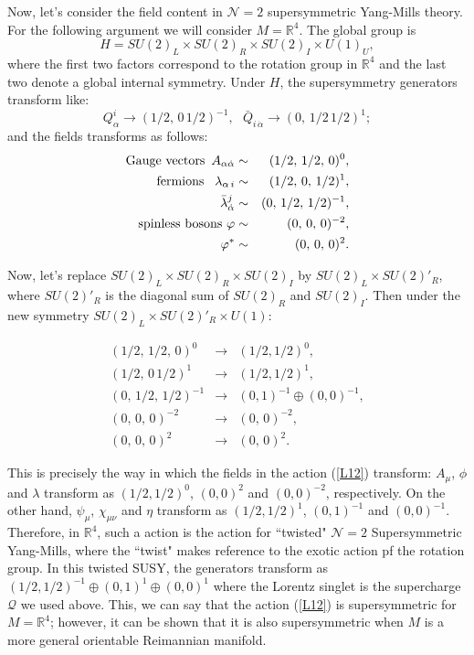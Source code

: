 \documentclass[12pt, onecolumn]{article}
\begin{document}
Now, let's consider the field content in $\mathcal{N}=2$ supersymmetric Yang-Mills theory. For the following argument we will consider $M= \mathbb{R}^4$. The global group is $$H=SU(2)_L\times SU(2)_R\times SU(2)_I\times U(1)_U,$$ where the first two factors correspond to the rotation group in $\mathbb{R}^4$ and the last two denote a global internal symmetry. Under $H$, the supersymmetry generators transform like:
\begin{equation}
Q^i_\alpha \longrightarrow  (1/2,\,0\,1/2)^{-1},\,\,\,\,\bar{Q}_{i\,\dot{\alpha}} \longrightarrow  (0,\,1/2\,1/2)^{1};
\end{equation} 
and the fields transforms as follows:
\begin{eqnarray}
{\rm Gauge\,\, vectors}\,\,\,A_{\alpha \dot{\alpha}} &\sim & (1/2,\,1/2,\,0)^0, \nonumber \\
{\rm fermions\,\,}\,\,\,\lambda_{\alpha\, i} &\sim & (1/2,\,0,\,1/2)^{1}, \nonumber \\
{\rm \,\,\,\,\,\,\,\,\,}\bar{\lambda}_{\dot{\alpha}}^j &\sim & (0,\,1/2,\,1/2)^{-1}, \\
{\rm spinless\,\,bosons\,\,}\varphi &\sim & (0,\,0,\,0)^{-2}, \nonumber \\
{\rm \,\,\,\,\,\,\,\,\,\,\,\,\,\,\,}\varphi^* &\sim & (0,\,0,\,0)^{2}. \nonumber 
\end{eqnarray}

Now, let's replace $SU(2)_L\times SU(2)_R\times SU(2)_I$ by $SU(2)_L\times SU(2)'_R$, where $SU(2)'_R$ is the diagonal sum of $SU(2)_R$ and $SU(2)_I$. Then under the new symmetry $SU(2)_L\times SU(2)'_R\times U(1)$:

\begin{eqnarray} 
(1/2,\,1/2,\,0)^0 &\longrightarrow & (1/2,1/2)^0, \nonumber \\
(1/2,\,0\,1/2)^{1} &\longrightarrow & (1/2,1/2)^1, \nonumber \\
(0,\,1/2,\,1/2)^{-1} &\longrightarrow & (0,1)^{-1}\oplus(0,0)^{-1}, \\
(0,\,0,\,0)^{-2}&\longrightarrow &(0,\,0)^{-2},\nonumber \\
(0,\,0,\,0)^{2}&\longrightarrow &(0,\,0)^{2}.\nonumber 
\end{eqnarray}

This is precisely the way in which the fields in the action (\ref{L12}) transform: $A_\mu$, $\phi$ and $\lambda$ transform as $(1/2,1/2)^0$, $(0,0)^{2}$ and $(0,0)^{-2}$, respectively. On the other hand, $\psi_\mu$, $\chi_{\mu\nu}$ and $\eta$ transform as $(1/2,1/2)^1$, $(0,1)^{-1}$ and $(0,0)^{-1}$. Therefore, in $\mathbb{R}^4$, such a action is the action for ``twisted" $\mathcal{N}=2$ Supersymmetric Yang-Mills, where the ``twist" makes reference to the exotic action pf the rotation group. In this twisted SUSY, the generators transform as $(1/2,1/2)^{-1}\oplus(0,1)^{1}\oplus(0,0)^1$ where the Lorentz singlet is the supercharge $\mathcal{Q}$ we used above. This, we can say that the action (\ref{L12}) is supersymmetric for $M=\mathbb{R}^4$; however, it can be shown that it is also supersymmetric when $M$ is a more general orientable Reimannian manifold.
\end{document}
